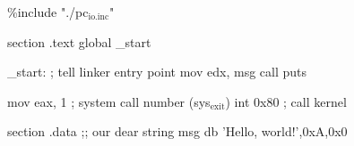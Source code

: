 \documentclass[11pt]{article}
\author{Galindo}
\date{\today}
\title{}
\begin{document}
\tableofcontents

\%include "./pc\(_{\text{io.inc}}\)"

section	.text                   
	global \_start               

\_start:                         ; tell linker entry point  
	mov edx, msg
	call puts

mov	eax, 1                  ; system call number (sys\(_{\text{exit}}\))
int	0x80                    ; call kernel

section	.data
    ;; our dear string    
    msg	db	'Hello, world!',0xA,0x0
\end{document}
